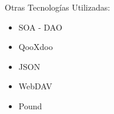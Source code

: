 \begin{frame}{Otras Tecnologías Utilizadas:\newline}
\begin{itemize}
	
	\item SOA - DAO
	\pause
	\item QooXdoo
	\pause
	\item JSON
	\pause
	\item WebDAV
	\pause
	\item Pound
	
\end{itemize}
\end{frame}
